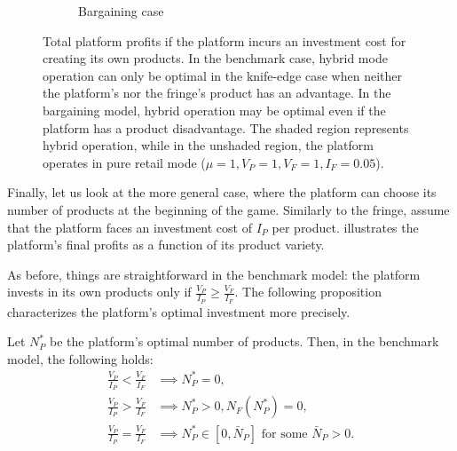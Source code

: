 \begin{figure}
\begin{subfigure}[b]{0.45\textwidth}
        \caption{Bargaining case}
        \label{fig:optimal_n_p_bargaining}
    \end{subfigure}
    \caption{Total platform profits if the platform incurs an investment cost for creating its own products. In the benchmark case, hybrid mode operation can only be optimal in the knife-edge case when neither the platform's nor the fringe's product has an advantage. In the bargaining model, hybrid operation may be optimal even if the platform has a product disadvantage. The shaded region represents hybrid operation, while in the unshaded region, the platform operates in pure retail mode ($\mu = 1, V_P = 1, V_F = 1, I_F = 0.05$).}
    \label{fig:optimal_n_p}
\end{figure}


Finally, let us look at the more general case, where the platform can choose its number of products at the beginning of the game.
Similarly to the fringe, assume that the platform faces an investment cost of $I_P$ per product.
 illustrates the platform's final profits as a function of its product variety.

As before, things are straightforward in the benchmark model: the platform invests in its own products only if $\frac{V_P}{I_P} \geq \frac{V_F}{I_F}$.
The following proposition characterizes the platform's optimal investment more precisely.
\begin{proposition}
    \label{prop:optimal_n_p_benchmark}
    Let $N_P^*$ be the platform's optimal number of products.
    Then, in the benchmark model, the following holds:
    \begin{align*}
        \frac{V_P}{I_P} < \frac{V_F}{I_F} &\implies N_P^* = 0, \\
        \frac{V_P}{I_P} > \frac{V_F}{I_F} &\implies N_P^* > 0, N_F(N_P^*) = 0, \\
        \frac{V_P}{I_P} = \frac{V_F}{I_F} &\implies N_P^* \in [0, \bar{N}_P] \text{ for some } \bar{N}_P > 0.
    \end{align*}
\end{proposition}

